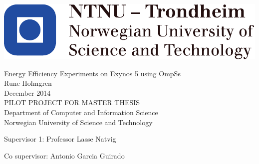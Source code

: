 
\thispagestyle{empty}
\includegraphics[scale=1.1]{fig/NTNU}
\mbox{}\\[6pc]
\begin{center}
\Huge{Energy Efficiency Experiments on Exynos 5 using OmpSs}\\[2pc]

\Large{Rune Holmgren}\\[1pc]
\large{December 2014}\\[2pc]

PILOT PROJECT FOR MASTER THESIS\\
Department of Computer and Information Science\\
Norwegian University of Science and Technology
\end{center}
\vfill

\noindent Supervisor 1: Professor Lasse Natvig

\noindent Co supervisor: Antonio Garcia Guirado

